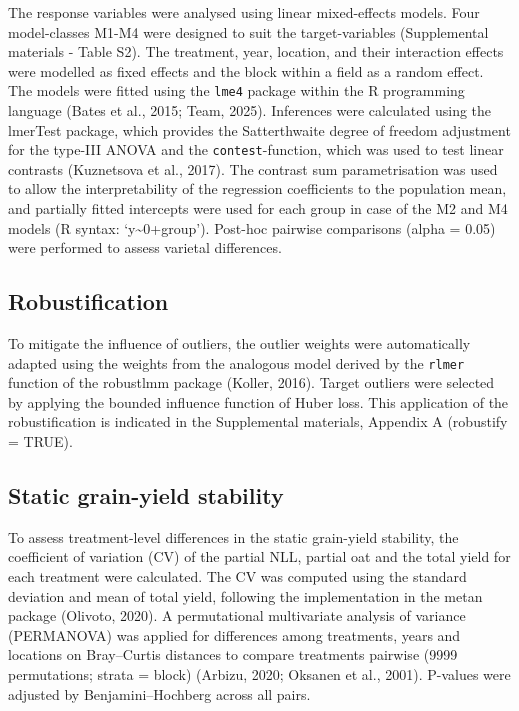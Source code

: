 \documentclass[
  british,
  a4paper,
  DIV=11,
  numbers=noendperiod]{scrreprt}
\begin{document}
The response variables were analysed using linear mixed-effects models.
Four model-classes M1-M4 were designed to suit the target-variables
(Supplemental materials - Table S2). The treatment, year, location, and
their interaction effects were modelled as fixed effects and the block
within a field as a random effect. The models were fitted using the
\texttt{lme4} package within the R programming language (Bates et al.,
2015; Team, 2025). Inferences were calculated using the lmerTest
package, which provides the Satterthwaite degree of freedom adjustment
for the type-III ANOVA and the \texttt{contest}-function, which was used
to test linear contrasts (Kuznetsova et al., 2017). The contrast sum
parametrisation was used to allow the interpretability of the regression
coefficients to the population mean, and partially fitted intercepts
were used for each group in case of the M2 and M4 models (R syntax:
`y\textasciitilde0+group'). Post-hoc pairwise comparisons (alpha = 0.05)
were performed to assess varietal differences.

\subsection{Robustification}\label{robustification}

To mitigate the influence of outliers, the outlier weights were
automatically adapted using the weights from the analogous model derived
by the \texttt{rlmer} function of the robustlmm package (Koller, 2016).
Target outliers were selected by applying the bounded influence function
of Huber loss. This application of the robustification is indicated in
the Supplemental materials, Appendix A (robustify = TRUE).

\subsection{Static grain-yield
stability}\label{static-grain-yield-stability}

To assess treatment‐level differences in the static grain-yield
stability, the coefficient of variation (CV) of the partial NLL, partial
oat and the total yield for each treatment were calculated. The CV was
computed using the standard deviation and mean of total yield, following
the implementation in the metan package (Olivoto, 2020). A permutational
multivariate analysis of variance (PERMANOVA) was applied for
differences among treatments, years and locations on Bray--Curtis
distances to compare treatments pairwise (9999 permutations; strata =
block) (Arbizu, 2020; Oksanen et al., 2001). P-values were adjusted by
Benjamini--Hochberg across all pairs.
\end{document}
